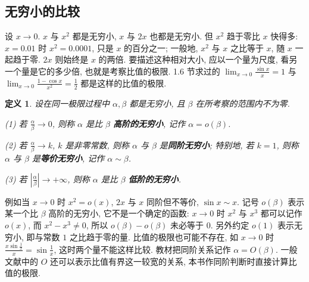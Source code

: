 \documentclass[UTF8,openany]{ctexbook}
\theoremstyle{chinesetextbook}
\newtheorem{definition}{定义}[section]
\begin{document}
\subsection{无穷小的比较}
设 $x\to0$. $x$ 与 $x^2$ 都是无穷小, $x$ 与 $2x$ 也都是无穷小. 但 $x^2$ 趋于零比 $x$ 快得多: $x=0.01$ 时 $x^2=0.0001$, 只是 $x$ 的百分之一; 一般地, $x^2$ 与 $x$ 之比等于 $x$, 随 $x$ 一起趋于零. $2x$ 则始终是 $x$ 的两倍. 要描述这种相对大小, 应以一个量为尺度, 看另一个量是它的多少倍, 也就是考察比值的极限. 1.6 节求过的 $\displaystyle\lim_{x\to0}\frac{\sin x}x=1$ 与 $\displaystyle\lim_{x\to0}\frac{1-\cos x}{x^2}=\frac12$ 都是这样的比值的极限.
\begin{definition}
设在同一极限过程中 $\alpha,\beta$ 都是无穷小, 且 $\beta$ 在所考察的范围内不为零.

\textup{(1)} 若 $\displaystyle\frac\alpha\beta\to0$, 则称 $\alpha$ 是比 $\beta$ \textbf{高阶的无穷小}, 记作 $\alpha=o(\beta)$.

\textup{(2)} 若 $\displaystyle\frac\alpha\beta\to k$, $k$ 是非零常数, 则称 $\alpha$ 与 $\beta$ 是\textbf{同阶无穷小}; 特别地, 若 $k=1$, 则称 $\alpha$ 与 $\beta$ 是\textbf{等价无穷小}, 记作 $\alpha\sim\beta$.

\textup{(3)} 若 $\displaystyle\left|\frac\alpha\beta\right|\to+\infty$, 则称 $\alpha$ 是比 $\beta$ \textbf{低阶的无穷小}.
\end{definition}
例如当 $x\to0$ 时 $x^2=o(x)$, $2x$ 与 $x$ 同阶但不等价, $\sin x\sim x$. 记号 $o(\beta)$ 表示某一个比 $\beta$ 高阶的无穷小, 它不是一个确定的函数: $x\to0$ 时 $x^2$ 与 $x^3$ 都可以记作 $o(x)$, 而 $x^2-x^3\ne0$, 所以 $o(\beta)-o(\beta)$ 未必等于 $0$. 另外约定 $o(1)$ 表示无穷小, 即与常数 $1$ 之比趋于零的量. 比值的极限也可能不存在, 如 $x\to0$ 时 $\displaystyle\frac{x\sin\frac1x}x=\sin\frac1x$, 这时两个量不能这样比较. 教材把同阶关系记作 $\alpha=O(\beta)$. 一般文献中的 $O$ 还可以表示比值有界这一较宽的关系, 本书作同阶判断时直接计算比值的极限.
\end{document}
